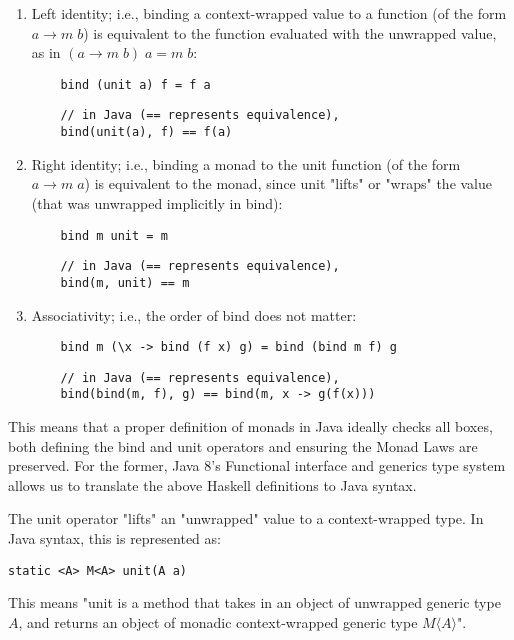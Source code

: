 \begin{enumerate}
    \item Left identity; i.e., binding a context-wrapped value to a function (of the form $a \to m\;b$) is equivalent to the function evaluated with the unwrapped value, as in $(a \to m\;b)\;a = m\;b$:
    \begin{verbatim}
    bind (unit a) f = f a
    \end{verbatim}
    \begin{verbatim}
    // in Java (== represents equivalence),
    bind(unit(a), f) == f(a)
    \end{verbatim}
    \item Right identity; i.e., binding a monad to the unit function (of the form $a \to m\;a$) is equivalent to the monad, since unit "lifts" or "wraps" the value (that was unwrapped implicitly in bind):
    \begin{verbatim}
    bind m unit = m
    \end{verbatim}
    \begin{verbatim}
    // in Java (== represents equivalence),
    bind(m, unit) == m
    \end{verbatim}
    \item Associativity; i.e., the order of bind does not matter:
    \begin{verbatim}
    bind m (\x -> bind (f x) g) = bind (bind m f) g
    \end{verbatim}
    \begin{verbatim}
    // in Java (== represents equivalence),
    bind(bind(m, f), g) == bind(m, x -> g(f(x)))
    \end{verbatim}
\end{enumerate}

This means that a proper definition of monads in Java ideally checks all boxes, both defining the bind and unit operators and ensuring the Monad Laws are preserved. For the former, Java 8's Functional interface and generics type system allows us to translate the above Haskell definitions to Java syntax.

The unit operator "lifts" an "unwrapped" value to a context-wrapped type. In Java syntax, this is represented as:
\begin{verbatim}
static <A> M<A> unit(A a)
\end{verbatim}

This means "unit is a method that takes in an object of unwrapped generic type $A$, and returns an object of monadic context-wrapped generic type $M\langle A \rangle$".

